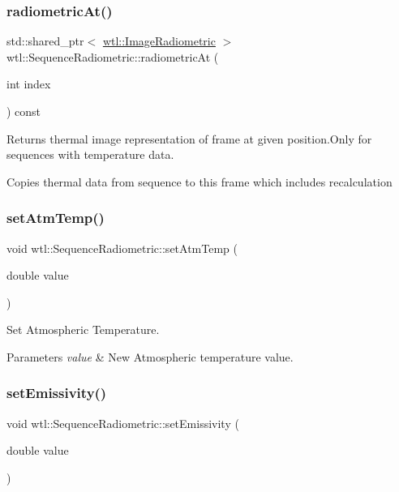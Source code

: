 \subsubsection{\texorpdfstring{radiometric\+At()}{radiometricAt()}}
{\footnotesize\ttfamily std\+::shared\+\_\+ptr$<$ \hyperlink{classwtl_1_1_image_radiometric}{wtl\+::\+Image\+Radiometric} $>$ wtl\+::\+Sequence\+Radiometric\+::radiometric\+At (\begin{DoxyParamCaption}\item[{int}]{index }\end{DoxyParamCaption}) const}



Returns thermal image representation of frame at given position.\+Only for sequences with temperature data. 

Copies thermal data from sequence to this frame which includes recalculation \mbox{\label{classwtl_1_1_sequence_radiometric_ac98bfc0193618acc5d62518fb058736b}} 
\subsubsection{\texorpdfstring{set\+Atm\+Temp()}{setAtmTemp()}}
{\footnotesize\ttfamily void wtl\+::\+Sequence\+Radiometric\+::set\+Atm\+Temp (\begin{DoxyParamCaption}\item[{double}]{value }\end{DoxyParamCaption})}



Set Atmospheric Temperature. 


\begin{DoxyParams}{Parameters}
{\em value} & New Atmospheric temperature value. \\
\hline
\end{DoxyParams}
\mbox{\label{classwtl_1_1_sequence_radiometric_a3faab55fbc056ae2a50f690d78588095}} 
\subsubsection{\texorpdfstring{set\+Emissivity()}{setEmissivity()}}
{\footnotesize\ttfamily void wtl\+::\+Sequence\+Radiometric\+::set\+Emissivity (\begin{DoxyParamCaption}\item[{double}]{value }\end{DoxyParamCaption})}




